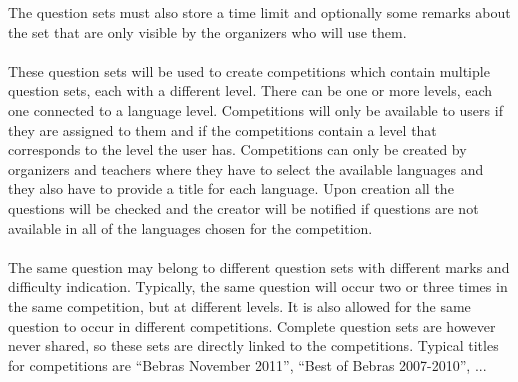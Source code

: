 	The question sets must also store a time limit and optionally some remarks about the
	set that are only visible by the organizers who will use them. \\
	\\
	These question sets will be used to create competitions which contain multiple
	question sets, each with a different level. There can be one or more levels, each
	one connected to a language level. Competitions will only be available to users if
	they are assigned to them and if the competitions contain a level that corresponds to
	the level the user has. Competitions can only be created by organizers and teachers where they have
	to select the available languages and they also have to provide a title for each
	language. Upon creation all the questions will be checked and the creator will be
	notified if questions are not available in all of the languages chosen for the
	competition.\\
	\\
	The same question may belong to different question sets with different marks and
	difficulty indication. Typically, the same question will occur two or three times in
	the same competition, but at different levels. It is also allowed for the same
	question to occur in different competitions. Complete question sets are however never
	shared, so these sets are directly linked to the competitions. Typical titles for
	competitions are ``Bebras November 2011'', ``Best of Bebras 2007-2010'', ...
	
